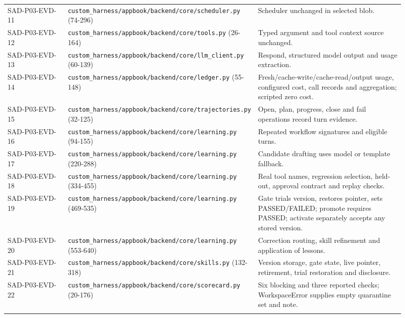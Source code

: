 \documentclass[10pt,letterpaper]{article}
\begin{document}
\begin{longtable}{@{}>{\raggedright\arraybackslash}p{0.17\linewidth}>{\raggedright\arraybackslash}p{0.34\linewidth}>{\raggedright\arraybackslash}p{0.41\linewidth}@{}}
SAD-P03-EVD-11 & \nolinkurl{custom_harness/appbook/backend/core/scheduler.py} (74-296) & Scheduler unchanged in selected blob.\\\addlinespace
SAD-P03-EVD-12 & \nolinkurl{custom_harness/appbook/backend/core/tools.py} (26-164) & Typed argument and tool context source unchanged.\\\addlinespace
SAD-P03-EVD-13 & \nolinkurl{custom_harness/appbook/backend/core/llm_client.py} (60-139) & Respond, structured model output and usage extraction.\\\addlinespace
SAD-P03-EVD-14 & \nolinkurl{custom_harness/appbook/backend/core/ledger.py} (55-148) & Fresh/cache-write/cache-read/output usage, configured cost, call records and aggregation; scripted zero cost.\\\addlinespace
SAD-P03-EVD-15 & \nolinkurl{custom_harness/appbook/backend/core/trajectories.py} (32-125) & Open, plan, progress, close and fail operations record turn evidence.\\\addlinespace
SAD-P03-EVD-16 & \nolinkurl{custom_harness/appbook/backend/core/learning.py} (94-155) & Repeated workflow signatures and eligible turns.\\\addlinespace
SAD-P03-EVD-17 & \nolinkurl{custom_harness/appbook/backend/core/learning.py} (220-288) & Candidate drafting uses model or template fallback.\\\addlinespace
SAD-P03-EVD-18 & \nolinkurl{custom_harness/appbook/backend/core/learning.py} (334-455) & Real tool names, regression selection, held-out, approval contract and replay checks.\\\addlinespace
SAD-P03-EVD-19 & \nolinkurl{custom_harness/appbook/backend/core/learning.py} (469-535) & Gate trials version, restores pointer, sets PASSED/FAILED; promote requires PASSED; activate separately accepts any stored version.\\\addlinespace
SAD-P03-EVD-20 & \nolinkurl{custom_harness/appbook/backend/core/learning.py} (553-640) & Correction routing, skill refinement and application of lessons.\\\addlinespace
SAD-P03-EVD-21 & \nolinkurl{custom_harness/appbook/backend/core/skills.py} (132-318) & Version storage, gate state, live pointer, retirement, trial restoration and disclosure.\\\addlinespace
SAD-P03-EVD-22 & \nolinkurl{custom_harness/appbook/backend/core/scorecard.py} (20-176) & Six blocking and three reported checks; WorkspaceError supplies empty quarantine set and note.\\\addlinespace

\end{longtable}
\end{document}
